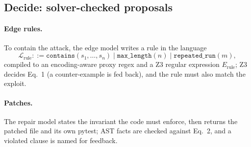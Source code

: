 \documentclass[10pt,a4paper]{article}
\begin{document}
\subsection{Decide: solver-checked proposals}
\paragraph{Edge rules.} To contain the attack, the edge model writes a rule in the language
\begin{equation}
\mathcal{L}_{\mathrm{rule}} ::= \mathtt{contains}(s_1, \dots, s_n) \mid \mathtt{max\_length}(n) \mid \mathtt{repeated\_run}(m),
\end{equation}
compiled to an encoding-aware proxy regex and a Z3 regular expression $E_{\mathrm{rule}}$; Z3 decides Eq.~1 (a counter-example is fed back), and the rule must also match the exploit.

\paragraph{Patches.} The repair model states the invariant the code must enforce, then returns the patched file and its own pytest; AST facts are checked against Eq.~2, and a violated clause is named for feedback.
\end{document}
